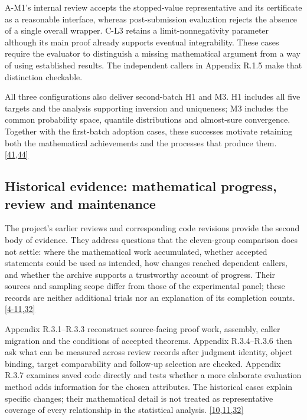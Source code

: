 A-M1's internal review accepts the stopped-value representative and its certificate as a reasonable interface, whereas post-submission evaluation rejects the absence of a single overall wrapper. C-L3 retains a limit-nonnegativity parameter although its main proof already supports eventual integrability. These cases require the evaluator to distinguish a missing mathematical argument from a way of using established results. The independent callers in Appendix R.1.5 make that distinction checkable.

All three configurations also deliver second-batch H1 and M3. H1 includes all five targets and the analysis supporting inversion and uniqueness; M3 includes the common probability space, quantile distributions and almost-sure convergence. Together with the first-batch adoption cases, these successes motivate retaining both the mathematical achievements and the processes that produce them. \href{en.pdf\#ref-41}{\mbox{[41,44]}}

\subsection[Historical evidence: mathematical progress, review and maintenance]{\texorpdfstring{\protect\hypertarget{r3}{}Historical evidence: mathematical progress, review and maintenance}{Historical evidence: mathematical progress, review and maintenance}}
The project's earlier reviews and corresponding code revisions provide the second body of evidence. They address questions that the eleven-group comparison does not settle: where the mathematical work accumulated, whether accepted statements could be used as intended, how changes reached dependent callers, and whether the archive supports a trustworthy account of progress. Their sources and sampling scope differ from those of the experimental panel; these records are neither additional trials nor an explanation of its completion counts. \href{en.pdf\#ref-4}{\mbox{[4-11,32]}}

Appendix R.3.1–R.3.3 reconstruct source-facing proof work, assembly, caller migration and the conditions of accepted theorems. Appendix R.3.4–R.3.6 then ask what can be measured across review records after judgment identity, object binding, target comparability and follow-up selection are checked. Appendix R.3.7 examines saved code directly and tests whether a more elaborate evaluation method adds information for the chosen attributes. The historical cases explain specific changes; their mathematical detail is not treated as representative coverage of every relationship in the statistical analysis. \href{en.pdf\#ref-10}{\mbox{[10,11,32]}}

